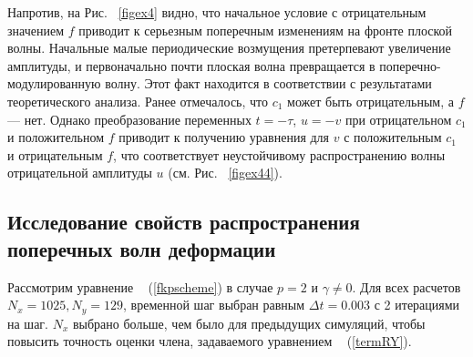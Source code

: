 Напротив, на Рис. ~\ref{figex4} видно, что начальное условие с отрицательным значением $ f $ приводит к серьезным поперечным изменениям на фронте плоской волны. Начальные малые периодические возмущения претерпевают увеличение амплитуды, и первоначально почти плоская волна превращается в поперечно-модулированную волну. Этот факт находится в соответствии с результатами теоретического анализа. Ранее отмечалось, что $ c_1 $ может быть отрицательным, а $ f $ --- нет. Однако преобразование переменных $ t = - \tau $, $ u = -v $ при отрицательном $ c_1 $ и положительном $ f $ приводит к получению уравнения для $ v $ с положительным $ c_1 $ и отрицательным $ f $, что соответствует неустойчивому распространению волны отрицательной амплитуды $ u $ (см. Рис. ~\ref{figex44}).

\subsection{Исследование свойств распространения поперечных волн деформации}

Рассмотрим уравнение ~ (\ref{fkpscheme}) в случае $ p = 2 $ и $ \gamma \ne 0 $.
Для всех расчетов $ N_x = 1025, N_y = 129 $, временной шаг выбран равным $ \Delta t = 0.003 $ с 2 итерациями на шаг. $ N_x $ выбрано больше, чем было для предыдущих симуляций, чтобы повысить точность оценки члена, задаваемого уравнением ~ (\ref{termRY}).

